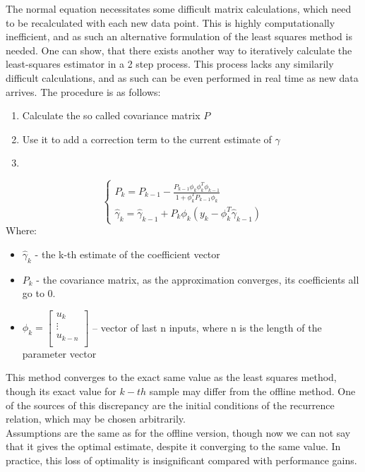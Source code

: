 \clearpage
{}
{

   The normal equation necessitates some difficult matrix calculations, which need to be recalculated with each new data point. This is highly computationally inefficient, and as such an alternative formulation of the least squares method is needed. One can show, that there exists another way to iteratively calculate the least-squares estimator in a 2 step process. This process lacks any similarily difficult calculations, and as such can be even performed in real time as new data arrives. The procedure is as follows:
   \begin{enumerate}
           \item Calculate the so called covariance matrix $P$
           \item Use it to add a correction term to the current estimate of  $\gamma$
           \item 
           
   \end{enumerate}
    \begin{equation}
        \begin{cases}
            P_k = P_{k-1} - \frac{P_{k-1}\phi_k\phi_k^{T}\phi_{k-1}}{1+\phi_k^{T}P_{k-1}\phi_k}\\
            \hat{\gamma}_k = \hat{\gamma}_{k-1} + P_k\phi_k(y_k - \phi_k^{T}\hat{\gamma}_{k-1})
        \end{cases}
    \end{equation}
    Where:
    \begin{itemize}
        \item $\hat{\gamma}_k$ - the k-th estimate of the coefficient vector
        \item  $P_k$ - the covariance matrix, as the approximation converges, its coefficients all go to 0.
        \item  $\phi_k = \begin{bmatrix}
       u_k \\
                  \vdots \\
                  u_{k-n} \\
\end{bmatrix}$ -- vector of last  n inputs, where n is the length of the parameter vector
    \end{itemize}
   This method converges to the exact same value as the least squares method, though its exact value for $k-th$ sample may differ from the offline method. One of the sources of this discrepancy are the initial conditions of the recurrence relation, which may be chosen arbitrarily.\\
Assumptions are the same as for the offline version, though now we can not say that it gives the optimal estimate, despite it converging to the same value. In practice, this loss of optimality is insignificant compared with performance gains.
}


